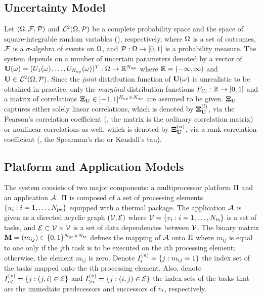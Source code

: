 \subsection{Uncertainty Model} 
Let $(\Omega, \mathcal{F}, \mathcal{P})$ and $\mathcal{L}^{2}(\Omega, \mathcal{P})$ be a complete probability space \cite{durrett2010} and the space of square-integrable random variables (\rvs), respectively, where $\Omega$ is a set of outcomes, $\mathcal{F}$ is a $\sigma$-algebra of events on $\Omega$, and $\mathcal{P}: \Omega \to [0, 1]$ is a probability measure. The system depends on a number of uncertain parameters denoted by a vector of \rvs\ $\mathbf{U}(\omega) = (U_1(\omega), \dots, U_{N_\text{up}}(\omega))^T: \Omega \to \mathbb{R}^{N_\text{up}}$ where $\mathbb{R} = (-\infty, \infty)$ and $\mathbf{U} \in \mathcal{L}^{2}(\Omega, \mathcal{P})$. Since the \emph{joint} distribution function of $\mathbf{U}(\omega)$ is unrealistic to be obtained in practice, only the \emph{marginal} distribution functions $F_{U_i}: \mathbb{R} \to [0, 1]$ and a matrix of correlations $\mathbf{\Xi}_{\mathbf{U}} \in [-1, 1]^{{N_\text{up}} \times {N_\text{up}}}$ are assumed to be given. $\mathbf{\Xi}_{\mathbf{U}}$ captures either solely linear correlations, which is denoted by $\mathbf{\Xi}^{(l)}_{\mathbf{U}}$, via the Pearson's correlation coefficient (\ie, the matrix is the ordinary correlation matrix) or nonlinear correlations as well, which is denoted by $\mathbf{\Xi}^{(n)}_{\mathbf{U}}$, via a rank correlation coefficient (\eg, the Spearman's rho or Kendall's tau).

\subsection{Platform and Application Models}  
The system consists of two major components: a multiprocessor platform $\Pi$ and an application $\mathcal{A}$. $\Pi$ is composed of a set of processing elements $\{ \pi_i: i = 1, \dots, {N_\text{pe}} \}$ equipped with a thermal package. The application $\mathcal{A}$ is given as a directed acyclic graph $(\mathcal{V}, \mathcal{E})$ where $\mathcal{V} = \{ v_i: i = 1, \dots, {N_\text{ts}} \}$ is a set of tasks, and $\mathcal{E} \subset \mathcal{V} \times \mathcal{V}$ is a set of data dependencies between $\mathcal{V}$. The binary matrix $\mathbf{M} = (m_{ij}) \in \{ 0, 1 \}^{{N_\text{pe}} \times {N_\text{ts}}}$ defines the mapping of $\mathcal{A}$ onto $\Pi$ where $m_{ij}$ is equal to one only if the $j$th task is to be executed on the $i$th processing element; otherwise, the element $m_{ij}$ is zero. Denote $I^{(\pi)}_i = \{ j: m_{ij} = 1 \}$ the index set of the tasks mapped onto the $i$th processing element. Also, denote $I^{(v)}_{i<} = \{ j: (j, i) \in \mathcal{E} \}$ and $I^{(v)}_{>i} = \{ j: (i, j) \in \mathcal{E} \}$ the index sets of the tasks that are the immediate predecessors and successors of $v_i$, respectively.

